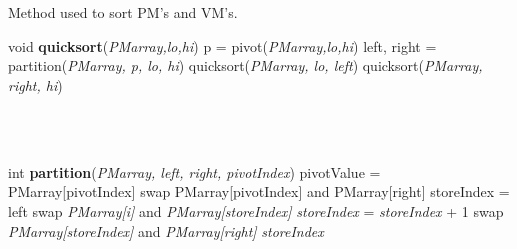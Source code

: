 \documentclass[a4paper,11pt]{article}
\begin{document}
\mbox{}\\\\
Method used to sort PM's and VM's.
\begin{algorithmic}[1]
\STATE void \textbf{quicksort}(\emph{PMarray,lo,hi})
\STATE p = pivot(\emph{PMarray,lo,hi})
\STATE left, right = partition(\emph{PMarray, p, lo, hi})
\STATE quicksort(\emph{PMarray, lo, left})
\STATE quicksort(\emph{PMarray, right, hi})
\ENDIF
\end{algorithmic}
\mbox{}\\\\
\begin{algorithmic}[1]
\STATE int \textbf{partition}(\emph{PMarray, left, right, pivotIndex})
\STATE pivotValue = PMarray[pivotIndex]
\STATE swap PMarray[pivotIndex] and PMarray[right]
\STATE storeIndex = left
\STATE swap \emph{PMarray[i]} and \emph{PMarray[storeIndex]}
\STATE \emph{storeIndex} = \emph{storeIndex} + 1
\ENDIF
\STATE swap \emph{PMarray[storeIndex]} and \emph{PMarray[right]}
\ENDFOR
\RETURN \emph{storeIndex}
\end{algorithmic}
\end{document}
